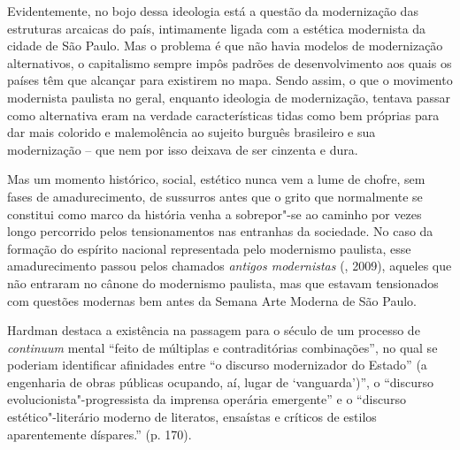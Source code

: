 {Evidentemente, no bojo dessa ideologia está a questão da modernização
das estruturas arcaicas do país, intimamente ligada com a estética
modernista da cidade de São Paulo. Mas o problema é que não havia
modelos de modernização alternativos, o capitalismo sempre impôs padrões
de desenvolvimento aos quais os países têm que alcançar para existirem
no mapa. Sendo assim, o que o movimento modernista paulista no geral,
enquanto ideologia de modernização, tentava passar como alternativa eram
na verdade características tidas como bem próprias para dar mais
colorido e malemolência ao sujeito burguês brasileiro e sua modernização
-- que nem por isso deixava de ser cinzenta e dura.

Mas um momento histórico, social, estético nunca vem a lume de chofre,
sem fases de amadurecimento, de sussurros antes que o grito que
normalmente se constitui como marco da história venha a sobrepor"-se ao
caminho por vezes longo percorrido pelos tensionamentos nas entranhas da
sociedade. No caso da formação do espírito nacional representada pelo
modernismo paulista, esse amadurecimento passou pelos chamados
\emph{antigos modernistas} (, 2009), aqueles que não entraram no
cânone do modernismo paulista, mas que estavam tensionados com questões
modernas bem antes da Semana Arte Moderna de São Paulo.

Hardman destaca a existência na passagem para o século  de um processo
de \emph{continuum} mental ``feito de múltiplas e contraditórias
combinações'', no qual se poderiam identificar afinidades entre ``o
discurso modernizador do Estado'' (a engenharia de obras públicas
ocupando, aí, lugar de `vanguarda')'', o ``discurso
evolucionista"-progressista da imprensa operária emergente'' e o
``discurso estético"-literário moderno de literatos, ensaístas e críticos
de estilos aparentemente díspares.'' (p. 170).

}
